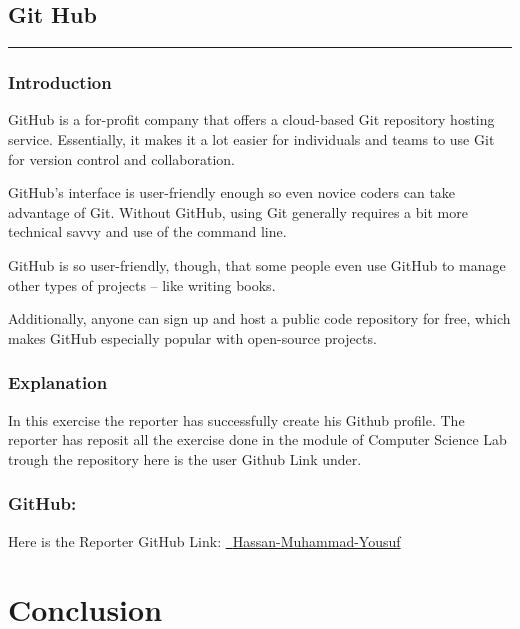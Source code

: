 \documentclass[12pt, A4]{report}
\begin{document}
\subsection{Git Hub}
\rule{\textwidth}{0.1pt}
\subsubsection{Introduction}
GitHub is a for-profit company that offers a cloud-based Git repository hosting service. Essentially, it makes it a lot easier for individuals and teams to use Git for version control and collaboration.

GitHub’s interface is user-friendly enough so even novice coders can take advantage of Git. Without GitHub, using Git generally requires a bit more technical savvy and use of the command line.

GitHub is so user-friendly, though, that some people even use GitHub to manage other types of projects – like writing books.

Additionally, anyone can sign up and host a public code repository for free, which makes GitHub especially popular with open-source projects.
\subsubsection{Explanation}
In this exercise the reporter has successfully create his Github profile. The reporter has reposit all the exercise done in the module of Computer Science Lab trough the repository here is the user Github Link under.
\subsubsection{GitHub:}
Here is the Reporter GitHub Link: \fontfamily{\sfdefault}\selectfont \color{black}
   \href{https://github.com/Hassan-Muhammad-Yousuf}{\raisebox{-0.1\height}\faGithub\ {Hassan-Muhammad-Yousuf}} \\



\section{Conclusion}
\end{document}
